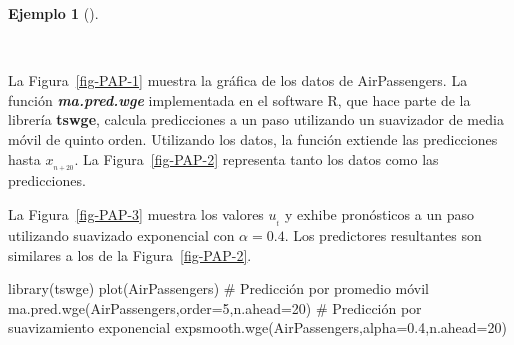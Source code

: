 \documentclass[
  us-letterpaper,
]{scrreprt}
\newenvironment{Shaded}{\begin{snugshade}}{\end{snugshade}}
\newcommand{\AttributeTok}[1]{\textcolor[rgb]{0.40,0.45,0.13}{#1}}
\newcommand{\CommentTok}[1]{\textcolor[rgb]{0.37,0.37,0.37}{#1}}
\newcommand{\DecValTok}[1]{\textcolor[rgb]{0.68,0.00,0.00}{#1}}
\newcommand{\FloatTok}[1]{\textcolor[rgb]{0.68,0.00,0.00}{#1}}
\newcommand{\FunctionTok}[1]{\textcolor[rgb]{0.28,0.35,0.67}{#1}}
\newcommand{\NormalTok}[1]{\textcolor[rgb]{0.00,0.23,0.31}{#1}}
\theoremstyle{plain}
\theoremstyle{definition}
\theoremstyle{definition}
\newtheorem{example}{Ejemplo}[chapter]
\theoremstyle{plain}
\theoremstyle{remark}
\begin{document}
\begin{example}[]\protect\hypertarget{exm-ppm}{}\label{exm-ppm}

~

\begin{tcolorbox}[enhanced jigsaw, bottomtitle=1mm, coltitle=black, breakable, leftrule=.75mm, left=2mm, rightrule=.15mm, titlerule=0mm, toprule=.15mm, toptitle=1mm, colback=white, colframe=quarto-callout-caution-color-frame, title={Predicción por promedio móvil y suavizado exponencial de AirPassengers}, colbacktitle=quarto-callout-caution-color!10!white, arc=.35mm, bottomrule=.15mm, opacitybacktitle=0.6, opacityback=0]

La Figura~\ref{fig-PAP-1} muestra la gráfica de los datos de
AirPassengers. La función \textbf{\emph{ma.pred.wge}} implementada en el
software R, que hace parte de la librería \textbf{tswge}, calcula
predicciones a un paso utilizando un suavizador de media móvil de quinto
orden. Utilizando los datos, la función extiende las predicciones hasta
\(x_{_{n+20}}\). La Figura~\ref{fig-PAP-2} representa tanto los datos
como las predicciones.

La Figura~\ref{fig-PAP-3} muestra los valores \(u_{_t}\) y exhibe
pronósticos a un paso utilizando suavizado exponencial con
\(\alpha = 0.4\). Los predictores resultantes son similares a los de la
Figura~\ref{fig-PAP-2}.

\begin{Shaded}
\begin{Highlighting}[]
\FunctionTok{library}\NormalTok{(tswge) }
\FunctionTok{plot}\NormalTok{(AirPassengers) }
\CommentTok{\# Predicción por promedio móvil }
\FunctionTok{ma.pred.wge}\NormalTok{(AirPassengers,}\AttributeTok{order=}\DecValTok{5}\NormalTok{,}\AttributeTok{n.ahead=}\DecValTok{20}\NormalTok{) }
\CommentTok{\# Predicción por suavizamiento exponencial }
\FunctionTok{expsmooth.wge}\NormalTok{(AirPassengers,}\AttributeTok{alpha=}\FloatTok{0.4}\NormalTok{,}\AttributeTok{n.ahead=}\DecValTok{20}\NormalTok{)}
\end{Highlighting}
\end{Shaded}

\begin{figure}[H]

\begin{minipage}{0.33\linewidth}

\centering{

}
\end{minipage}
\end{figure}
\end{tcolorbox}
\end{example}
\end{document}
